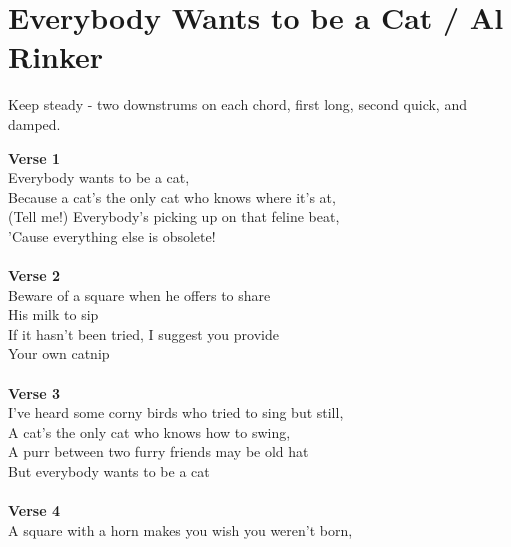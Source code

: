 \section{Everybody Wants to be a Cat / Al Rinker}\label{sec:everybodywantstobeacat}
\EmajorFudgeSeven
\EminorSeven
\EminorSix
\CmajorSeven
\Dseven
\Cseven
\Bseven
\Bminor
\AmajorSeven
\AminorSeven
\Cminor


\small{Keep steady - two downstrums on each chord, first long, second quick, and damped.}

\textbf{Verse 1}        \\          
Everybody wants to be a cat,\\
Because a cat's the only cat who knows where it's at,\\
(Tell me!) Everybody's picking up on that feline beat,\\
'Cause everything else is obsolete!\\
\\
\textbf{Verse 2}\\
Beware of a square when he offers to share\\
His milk to sip\\
If it hasn't been tried, I suggest you provide\\
Your own catnip\\
 \\
\textbf{Verse 3}\\
I've heard some corny birds who tried to sing but still, \\
A cat's the only cat who knows how to swing,\\
A purr between two furry friends may be old hat\\
But everybody wants to be a cat\\
 \\
\textbf{Verse 4}\\
A square with a horn makes you wish you weren't born,\\
